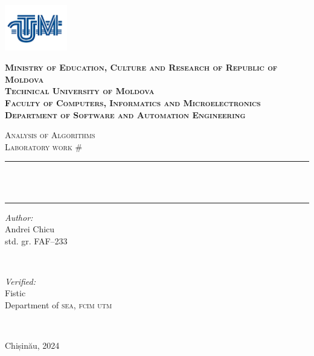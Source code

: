 \begin{titlepage}
\centering

\includegraphics[height=2cm]{utm_logo.png}

\bfseries
\textsc{Ministry of Education, Culture and Research of Republic of Moldova} \\
\textsc{Technical University of Moldova} \\
\textsc{Faculty of Computers, Informatics and Microelectronics} \\
\textsc{Department of Software and Automation Engineering} \\
\mdseries

\vfill

\textsc{\Large Analysis of Algorithms} \\
\textsc{\large Laboratory work \#\Num}\\[0.5cm]

\vspace{12pt}
\newcommand{\HRule}{\rule{\linewidth}{0.5mm}}
\HRule \\[0.2cm]
{ \LARGE \bfseries \Topic }\\[0.4cm]
\HRule
\vfill

\begin{minipage}[t]{0.4\textwidth}
\begin{flushleft} \large
\emph{Author:} \\
Andrei Chicu\\                        
std. gr. FAF--233
\end{flushleft}
\end{minipage}
~
\begin{minipage}[t]{0.4\textwidth}
\raggedleft \large
\emph{Verified:} \\
Fistic \\
Department of \textsc{sea, fcim utm}
\end{minipage}\\[3cm]
\vfill

Chișinău, 2024
\end{titlepage}
\setcounter{page}{2}
